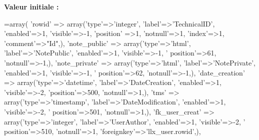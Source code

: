 {\bfseries Valeur initiale \+:}
\begin{DoxyCode}
=array(
        \textcolor{stringliteral}{'rowid'} => array(\textcolor{stringliteral}{'type'}=>\textcolor{stringliteral}{'integer'}, \textcolor{stringliteral}{'label'}=>\textcolor{stringliteral}{'TechnicalID'}, \textcolor{stringliteral}{'enabled'}=>1, \textcolor{stringliteral}{'visible'}=>-1, \textcolor{stringliteral}{'position'}
      =>1, \textcolor{stringliteral}{'notnull'}=>1, \textcolor{stringliteral}{'index'}=>1, \textcolor{stringliteral}{'comment'}=>\textcolor{stringliteral}{"Id"},),
        \textcolor{stringliteral}{'note\_public'} => array(\textcolor{stringliteral}{'type'}=>\textcolor{stringliteral}{'html'}, \textcolor{stringliteral}{'label'}=>\textcolor{stringliteral}{'NotePublic'}, \textcolor{stringliteral}{'enabled'}=>1, \textcolor{stringliteral}{'visible'}=>-1, \textcolor{stringliteral}{'
      position'}=>61, \textcolor{stringliteral}{'notnull'}=>-1,),
        \textcolor{stringliteral}{'note\_private'} => array(\textcolor{stringliteral}{'type'}=>\textcolor{stringliteral}{'html'}, \textcolor{stringliteral}{'label'}=>\textcolor{stringliteral}{'NotePrivate'}, \textcolor{stringliteral}{'enabled'}=>1, \textcolor{stringliteral}{'visible'}=>-1, \textcolor{stringliteral}{'
      position'}=>62, \textcolor{stringliteral}{'notnull'}=>-1,),
        \textcolor{stringliteral}{'date\_creation'} => array(\textcolor{stringliteral}{'type'}=>\textcolor{stringliteral}{'datetime'}, \textcolor{stringliteral}{'label'}=>\textcolor{stringliteral}{'DateCreation'}, \textcolor{stringliteral}{'enabled'}=>1, \textcolor{stringliteral}{'visible'}=>-2, \textcolor{stringliteral}{
      'position'}=>500, \textcolor{stringliteral}{'notnull'}=>1,),
        \textcolor{stringliteral}{'tms'} => array(\textcolor{stringliteral}{'type'}=>\textcolor{stringliteral}{'timestamp'}, \textcolor{stringliteral}{'label'}=>\textcolor{stringliteral}{'DateModification'}, \textcolor{stringliteral}{'enabled'}=>1, \textcolor{stringliteral}{'visible'}=>-2, \textcolor{stringliteral}{'
      position'}=>501, \textcolor{stringliteral}{'notnull'}=>1,),
        \textcolor{stringliteral}{'fk\_user\_creat'} => array(\textcolor{stringliteral}{'type'}=>\textcolor{stringliteral}{'integer'}, \textcolor{stringliteral}{'label'}=>\textcolor{stringliteral}{'UserAuthor'}, \textcolor{stringliteral}{'enabled'}=>1, \textcolor{stringliteral}{'visible'}=>-2, \textcolor{stringliteral}{'
      position'}=>510, \textcolor{stringliteral}{'notnull'}=>1, \textcolor{stringliteral}{'foreignkey'}=>\textcolor{stringliteral}{'llx\_user.rowid'},),

\end{DoxyCode}
